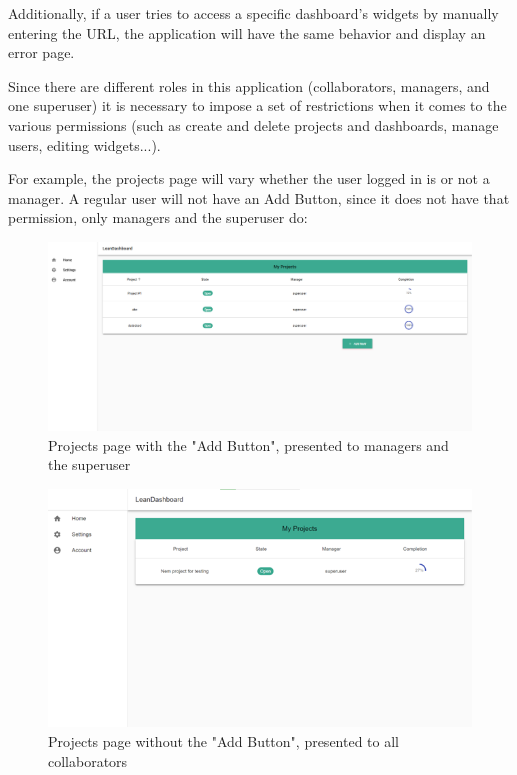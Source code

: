 \documentclass[a4paper,twoside,10pt]{report}
\begin{document}
Additionally, if a user tries to access a specific dashboard’s widgets by manually entering the URL, the application will have the same behavior and display an error page.

Since there are different roles in this application (collaborators, managers, and one superuser) it is necessary to impose a set of restrictions when it comes to the various permissions (such as create and delete projects and dashboards, manage users, editing widgets...).

For example, the projects page will vary whether the user logged in is or not a manager. A regular user will not have an Add Button, since it does not have that permission, only managers and the superuser do:
\begin{figure}[h!]
\center
  \includegraphics[width=\textwidth]{projectsPage.png}
\caption{Projects page with the "Add Button", presented to managers and the superuser }
\end{figure}

\begin{figure}[h!]
\center
  \includegraphics[width=\textwidth]{projectsPageNoAddButton.png}
\caption{Projects page without the "Add Button", presented to all collaborators}
\end{figure}
\end{document}
